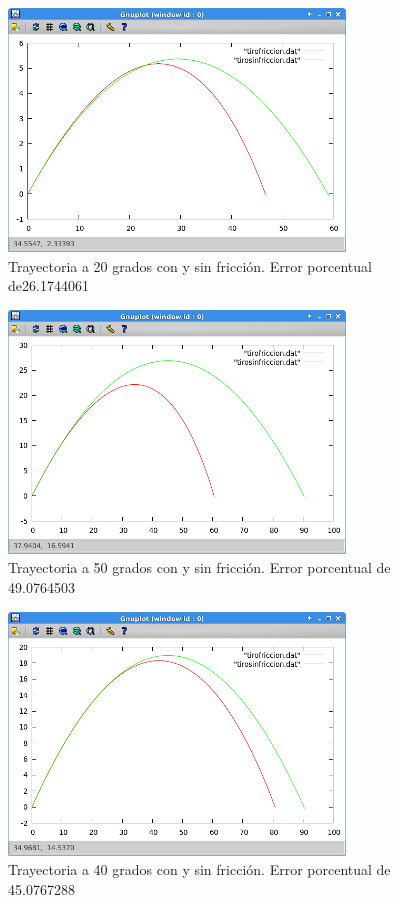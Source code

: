 \documentclass[12pt]{article}
\begin{document}
 \begin{figure}[H]
 \centering
 \includegraphics{producto620}
  \caption{Trayectoria a 20 grados con y sin fricción. Error porcentual de26.1744061  }
 \end{figure}
 
 \begin{figure}[H]
 \centering
 \includegraphics{producto650}
  \caption{Trayectoria a 50 grados con y sin fricción. Error porcentual de 49.0764503 }
 \end{figure}
 
 \begin{figure}[H]
 \centering
 \includegraphics{producto640}
  \caption{Trayectoria a 40 grados con y sin fricción. Error porcentual de 45.0767288  }
 \end{figure}
 
\end{document}
